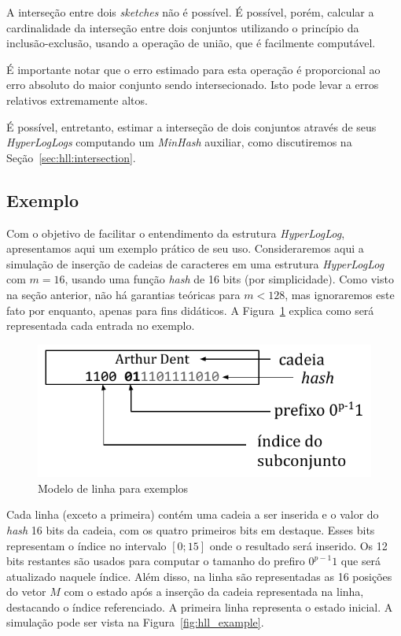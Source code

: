 A interseção entre dois \emph{sketches} não é possível. É possível, porém, calcular a cardinalidade da interseção entre dois conjuntos utilizando o princípio da inclusão-exclusão, usando a operação de união, que é facilmente computável.

É importante notar que o erro estimado para esta operação é proporcional ao erro absoluto do maior conjunto sendo intersecionado. Isto pode levar a erros relativos extremamente altos.

É possível, entretanto, estimar a interseção de dois conjuntos através de seus \emph{HyperLogLogs} computando um \emph{MinHash} auxiliar, como discutiremos na Seção~\ref{sec:hll:intersection}.

\subsection{Exemplo}\label{sec:hll:example}

Com o objetivo de facilitar o entendimento da estrutura \emph{HyperLogLog}, apresentamos aqui um exemplo prático de seu uso. Consideraremos aqui a simulação de inserção de cadeias de caracteres em uma estrutura \emph{HyperLogLog} com $m = 16$, usando uma função \emph{hash} de 16 bits (por simplicidade). Como visto na seção anterior, não há garantias teóricas para $m < 128$, mas ignoraremos este fato por enquanto, apenas para fins didáticos. A Figura~\ref{fig:hll_example_legend} explica como será representada cada entrada no exemplo.

\begin{figure}[!htbp]
  \centering
  \includegraphics[scale=0.6]{figures/hll_example_legend.pdf}
  \caption{Modelo de linha para exemplos}
  \label{fig:hll_example_legend}
\end{figure}

Cada linha (exceto a primeira) contém uma cadeia a ser inserida e o valor do \emph{hash} 16 bits da cadeia, com os quatro primeiros bits em destaque. Esses bits representam o índice no intervalo $[0;15]$ onde o resultado será inserido. Os 12 bits restantes são usados para computar o tamanho do prefiro $0^{p-1}1$ que será atualizado naquele índice. Além disso, na linha são representadas as 16 posições do vetor $M$ com o estado após a inserção da cadeia representada na linha, destacando o índice referenciado. A primeira linha representa o estado inicial. A simulação pode ser vista na Figura~\ref{fig:hll_example}.

